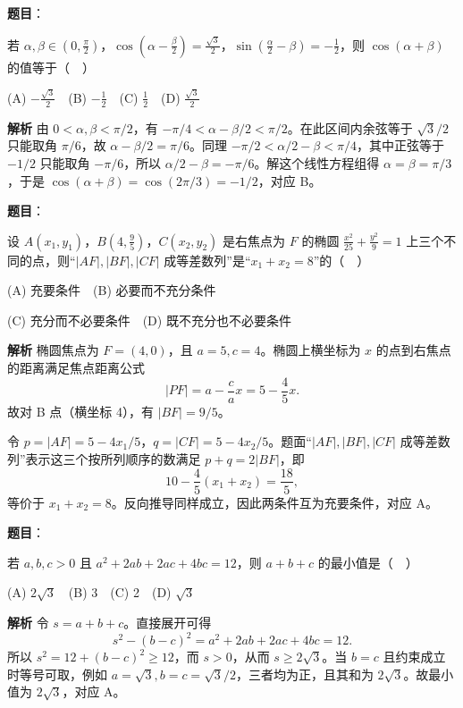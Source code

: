 \begin{answer}

\textbf{题目}：

若 \(\alpha,\beta\in\left(0,\frac\pi2\right)\)，\(\cos\left(\alpha-\frac\beta2\right)=\frac{\sqrt3}{2}\)，\(\sin\left(\frac\alpha2-\beta\right)=-\frac12\)，则 \(\cos(\alpha+\beta)\) 的值等于（　）

(A) \(-\frac{\sqrt3}{2}\)　(B) \(-\frac12\)　(C) \(\frac12\)　(D) \(\frac{\sqrt3}{2}\)

\textbf{解析}
由 \(0<\alpha,\beta<\pi/2\)，有
\(-\pi/4<\alpha-\beta/2<\pi/2\)。在此区间内余弦等于 \(\sqrt3/2\) 只能取角 \(\pi/6\)，故 \(\alpha-\beta/2=\pi/6\)。同理
\(-\pi/2<\alpha/2-\beta<\pi/4\)，其中正弦等于 \(-1/2\) 只能取角 \(-\pi/6\)，所以 \(\alpha/2-\beta=-\pi/6\)。解这个线性方程组得 \(\alpha=\beta=\pi/3\)，于是
\(\cos(\alpha+\beta)=\cos(2\pi/3)=-1/2\)，对应 B。


\end{answer}
\begin{answer}

\textbf{题目}：

设 \(A(x_1,y_1)\)，\(B\left(4,\frac95\right)\)，\(C(x_2,y_2)\) 是右焦点为 \(F\) 的椭圆 \(\frac{x^2}{25}+\frac{y^2}{9}=1\) 上三个不同的点，则“\(|AF|,|BF|,|CF|\) 成等差数列”是“\(x_1+x_2=8\)”的（　）

(A) 充要条件　(B) 必要而不充分条件

(C) 充分而不必要条件　(D) 既不充分也不必要条件

\textbf{解析}
椭圆焦点为 \(F=(4,0)\)，且 \(a=5,c=4\)。椭圆上横坐标为 \(x\) 的点到右焦点的距离满足焦点距离公式
\nopagebreak[4]
\[
|PF|=a-\frac ca x=5-\frac45x.
\]
故对 B 点（横坐标 4），有 \(|BF|=9/5\)。

令 \(p=|AF|=5-4x_1/5\)，\(q=|CF|=5-4x_2/5\)。题面“\(|AF|,|BF|,|CF|\) 成等差数列”表示这三个按所列顺序的数满足 \(p+q=2|BF|\)，即
\nopagebreak[4]
\[
10-\frac45(x_1+x_2)=\frac{18}{5},
\]
等价于 \(x_1+x_2=8\)。反向推导同样成立，因此两条件互为充要条件，对应 A。


\end{answer}
\begin{answer}

\textbf{题目}：

若 \(a,b,c>0\) 且 \(a^2+2ab+2ac+4bc=12\)，则 \(a+b+c\) 的最小值是（　）

(A) \(2\sqrt3\)　(B) 3　(C) 2　(D) \(\sqrt3\)

\textbf{解析}
令 \(s=a+b+c\)。直接展开可得
\nopagebreak[4]
\[
s^2-(b-c)^2=a^2+2ab+2ac+4bc=12.
\]
所以 \(s^2=12+(b-c)^2\ge12\)，而 \(s>0\)，从而 \(s\ge2\sqrt3\)。当 \(b=c\) 且约束成立时等号可取，例如 \(a=\sqrt3, b=c=\sqrt3/2\)，三者均为正，且其和为 \(2\sqrt3\)。故最小值为 \(2\sqrt3\)，对应 A。


\end{answer}
